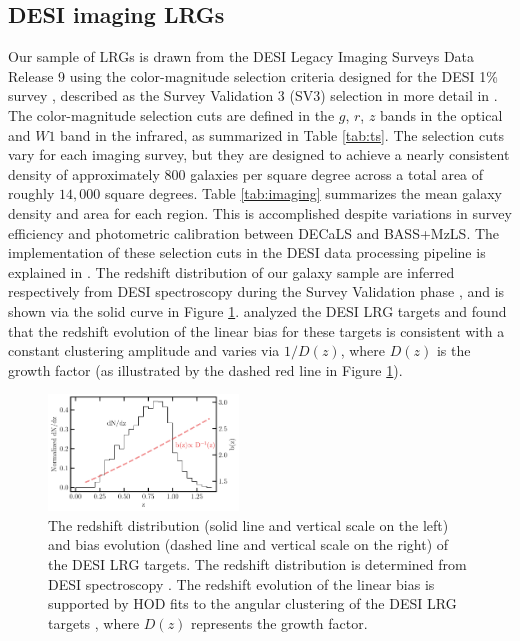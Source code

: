 \subsection{DESI imaging LRGs}
Our sample of LRGs is drawn from the DESI Legacy Imaging Surveys Data Release 9 \citep[DR9;][]{dey2018overview} using the color-magnitude selection criteria designed for the DESI 1\% survey \citep{desi2023sv}, described as the Survey Validation 3 (SV3) selection in more detail in \cite{zhou2022target}. The color-magnitude selection cuts are defined in the $g$, $r$, $z$ bands in the optical and $W1$ band in the infrared, as summarized in Table \ref{tab:ts}. The selection cuts vary for each imaging survey, but they are designed to achieve a nearly consistent density of approximately $800$ galaxies per square degree across a total area of roughly $14,000$ square degrees. Table \ref{tab:imaging} summarizes the mean galaxy density and area for each region. This is accomplished despite variations in survey efficiency and photometric calibration between DECaLS and BASS+MzLS. The implementation of these selection cuts in the DESI data processing pipeline is explained in \cite{myers2022}. The redshift distribution of our galaxy sample are inferred respectively from DESI spectroscopy during the Survey Validation phase \citep{desi2023sv}, and is shown via the solid curve in Figure \ref{fig:nz}. \cite{zhou2021clustering} analyzed the DESI LRG targets and found that the redshift evolution of the linear bias for these targets is consistent with a constant clustering amplitude and varies via $1/D(z)$, where $D(z)$ is the growth factor (as illustrated by the dashed red line in Figure \ref{fig:nz}). 

\begin{figure}
 \centering
 \includegraphics[width=0.45\textwidth]{figures/nz_lrg.pdf}
 \caption{The redshift distribution (solid line and vertical scale on the left) and bias evolution (dashed line and vertical scale on the right) of the DESI LRG targets. The redshift distribution is determined from DESI spectroscopy \citep{desi2023sv}. The redshift evolution of the linear bias is supported by HOD fits to the angular clustering of the DESI LRG targets \citep{zhou2021clustering}, where $D(z)$ represents the growth factor.}
 \label{fig:nz}
\end{figure}

